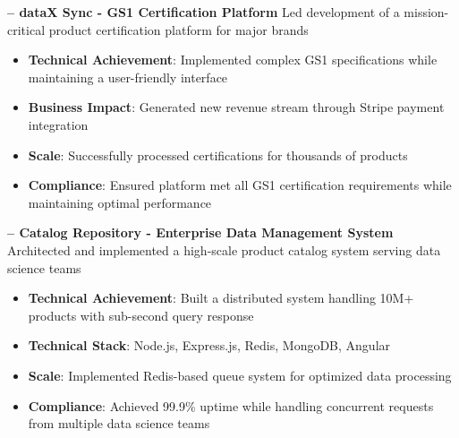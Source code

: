 \begin{sectionContainer}
	\vspace{0.4em}\noindent\large\textbf{– dataX Sync - GS1 Certification Platform}
	\vspace{0.8em} \newline
	\noindent Led development of a mission-critical product certification platform for major brands
	\begin{itemize}[leftmargin=*, nosep, itemsep=0.4em, before=\vspace{0.6em}, after=\vspace{0.8em}, label={}]
		\item \textbf{Technical Achievement}: Implemented complex GS1 specifications while maintaining a user-friendly interface
		\item \textbf{Business Impact}: Generated new revenue stream through Stripe payment integration
		\item \textbf{Scale}: Successfully processed certifications for thousands of products
		\item \textbf{Compliance}: Ensured platform met all GS1 certification requirements while maintaining optimal performance
	\end{itemize}
\end{sectionContainer}

\begin{sectionContainer}
	\vspace{0.4em}\noindent\large\textbf{– Catalog Repository - Enterprise Data Management System}
	\vspace{0.8em} \newline
	\noindent Architected and implemented a high-scale product catalog system serving data science teams
	\begin{itemize}[leftmargin=*, nosep, itemsep=0.4em, before=\vspace{0.6em}, after=\vspace{0.8em}, label={}]
		\item \textbf{Technical Achievement}: Built a distributed system handling 10M+ products with sub-second query response
		\item \textbf{Technical Stack}: Node.js, Express.js, Redis, MongoDB, Angular
		\item \textbf{Scale}: Implemented Redis-based queue system for optimized data processing
		\item \textbf{Compliance}: Achieved 99.9\% uptime while handling concurrent requests from multiple data science teams
	\end{itemize}
\end{sectionContainer}

